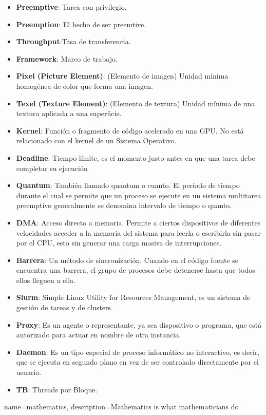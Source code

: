 \begin{itemize}
\item \textbf{Preemptive}: Tarea con privilegio.
\item \textbf{Preemption}: El hecho de ser preemtive.
\item \textbf{Throughput}:Tasa de transferencia.
\item \textbf{Framework}: Marco de trabajo.
\item \textbf{Pixel (Picture Element)}: (Elemento de imagen) Unidad mínima homogénea de color que forma una imagen.
\item \textbf{Texel (Texture Element)}: (Elemento de textura)  Unidad mínima de una textura aplicada a una superficie.
\item \textbf{Kernel}: Función o fragmento de código acelerado en una GPU. No está relacionado con el kernel de un Sistema Operativo.

\item \textbf{Deadline}: Tiempo límite, es el momento justo antes en que una tarea debe completar su ejecución

\item \textbf{Quantum}: También llamado quantum o cuanto. El período de tiempo durante el cual se permite que un proceso se ejecute en un sistema multitarea preemptivo generalmente se denomina intervalo de tiempo o quanto.


\item \textbf{DMA}: Acceso directo a memoria. Permite a ciertos dispositivos de diferentes velocidades acceder a la memoria del sistema para leerla o escribirla sin pasar por el CPU, esto sin generar una carga masiva de interrupciones.

\item \textbf{Barrera}: Un método de sincronización. Cuando en el código fuente se encuentra una barrera, el grupo de procesos debe detenerse hasta que todos ellos lleguen a ella.

\item \textbf{Slurm}: Simple Linux Utility for Resources Management, es un sistema de gestión de tareas y de clusters\cite{Slurm}.

\item \textbf{Proxy}: Es un agente o representante, ya sea dispositivo o programa, que está autorizado para actuar en nombre de otra instancia.

\item \textbf{ Daemon}: Es un tipo especial de proceso informático no interactivo, es decir, que se ejecuta en segundo plano en vez de ser controlado directamente por el usuario.

\item \textbf{TB}: Threads por Bloque.

\end{itemize}  


{
   name=mathematics,
    description={Mathematics is what mathematicians do}
}